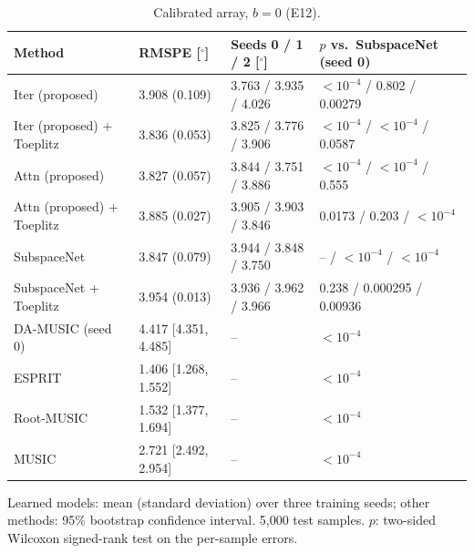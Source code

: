 \begin{table}[h!]
\centering
\small
\caption{Calibrated array, $b=0$ (E12).}
\label{tab:e12}
\begin{tabular}{llll}
\toprule
Method & RMSPE [$^\circ$] & Seeds 0 / 1 / 2 [$^\circ$] & $p$ vs.\ SubspaceNet (seed 0) \\
\midrule
Iter (proposed) & 3.908 (0.109) & 3.763 / 3.935 / 4.026 & $<10^{-4}$ / 0.802 / 0.00279 \\
Iter (proposed) + Toeplitz & 3.836 (0.053) & 3.825 / 3.776 / 3.906 & $<10^{-4}$ / $<10^{-4}$ / 0.0587 \\
Attn (proposed) & 3.827 (0.057) & 3.844 / 3.751 / 3.886 & $<10^{-4}$ / $<10^{-4}$ / 0.555 \\
Attn (proposed) + Toeplitz & 3.885 (0.027) & 3.905 / 3.903 / 3.846 & 0.0173 / 0.203 / $<10^{-4}$ \\
SubspaceNet & 3.847 (0.079) & 3.944 / 3.848 / 3.750 & -- / $<10^{-4}$ / $<10^{-4}$ \\
SubspaceNet + Toeplitz & 3.954 (0.013) & 3.936 / 3.962 / 3.966 & 0.238 / 0.000295 / 0.00936 \\
\midrule
DA-MUSIC (seed 0) & 4.417 [4.351, 4.485] & -- & $<10^{-4}$ \\
ESPRIT & 1.406 [1.268, 1.552] & -- & $<10^{-4}$ \\
Root-MUSIC & 1.532 [1.377, 1.694] & -- & $<10^{-4}$ \\
MUSIC & 2.721 [2.492, 2.954] & -- & $<10^{-4}$ \\
\hline
\end{tabular}
\par\smallskip\parbox{0.95\textwidth}{\footnotesize Learned models: mean (standard deviation) over three training seeds; other methods: 95\% bootstrap confidence interval. 5,000 test samples. $p$: two-sided Wilcoxon signed-rank test on the per-sample errors.}
\end{table}

